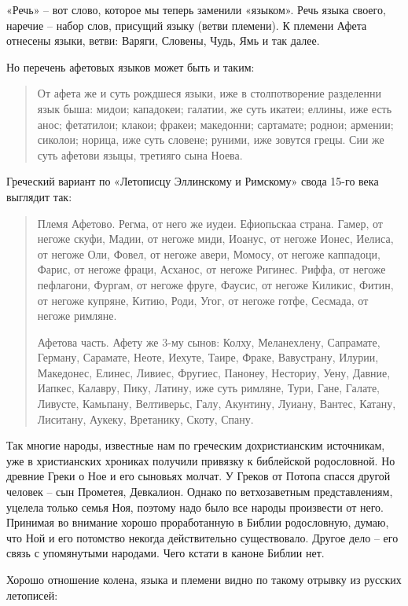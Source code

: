 «Речь» – вот слово, которое мы теперь заменили «языком». Речь языка своего, наречие – набор слов, присущий языку (ветви племени). К племени Афета отнесены языки, ветви: Варяги, Словены, Чудь, Ямь и так далее.

Но перечень афетовых языков может быть и таким:

\begin{quotation}
От афета же и суть рождшеся языки, иже в столпотворение разделенни язык быша: мидои; кападокеи; галатии, же суть икатеи; еллины, иже есть анос; фетатилои; клакои; фракеи; македонни; сартамате; роднои; армении; сиколои; норица, иже суть словене; руними, иже зовутся грецы. Сии же суть афетови языцы, третияго сына Ноева.
\end{quotation}

Греческий вариант по «Летописцу Эллинскому и Римскому» свода 15-го века выглядит так: 

\begin{quotation}
Племя Афетово. Регма, от него же иудеи. Ефиопьскаа страна. Гамер, от негоже скуфи, Мадии, от негоже миди, Иоанус, от негоже Ионес, Иелиса, от негоже Оли, Фовел, от негоже авери, Момосу, от негоже каппадоци, Фарис, от негоже фраци, Асханос, от негоже Ригинес. Риффа, от негоже пефлагони, Фургам, от негоже фруге, Фаусис, от негоже Киликис, Фитин, от негоже купряне, Китию, Роди, Угог, от негоже готфе, Сесмада, от негоже римляне.

Афетова часть. Афету же 3-му сынов: Колху, Меланехлену, Сапрамате, Герману, Сарамате, Неоте, Иехуте, Таире, Фраке, Вавустрану, Илурии, Македонес, Елинес, Ливиес, Фругиес, Панонеу, Несториу, Уену, Давние, Иапкес, Калавру, Пику, Латину, иже суть римляне, Тури, Гане, Галате, Ливусте, Камьпану, Велтиверьс, Галу, Акунтину, Луиану, Вантес, Катану, Лиситану, Аукеку, Вретанику, Скоту, Спану.
\end{quotation}

Так многие народы, известные нам по греческим дохристианским источникам, уже в христианских хрониках получили привязку к библейской родословной. Но древние Греки о Ное и его сыновьях молчат. У Греков от Потопа спасся другой человек – сын Прометея, Девкалион. Однако по ветхозаветным представлениям, уцелела только семья Ноя, поэтому надо было все народы произвести от него. Принимая во внимание хорошо проработанную в Библии родословную, думаю, что Ной и его потомство некогда действительно существовало. Другое дело – его связь с упомянутыми народами. Чего кстати в каноне Библии нет.

Хорошо отношение колена, языка и племени видно по такому отрывку из русских летописей:

